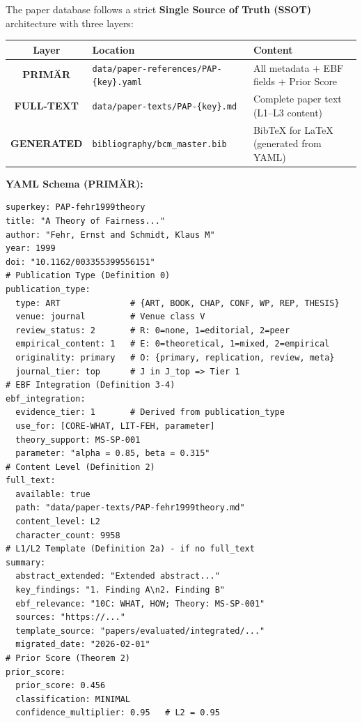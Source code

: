 \begin{tcolorbox}[colback=green!5!white, colframe=green!75!black,
    title=\textbf{SSOT Data Architecture: Paper Database}]

The paper database follows a strict \textbf{Single Source of Truth (SSOT)} architecture
with three layers:

\begin{table}[H]
\centering
\begin{tabular}{@{}clp{5.5cm}@{}}
\toprule
\textbf{Layer} & \textbf{Location} & \textbf{Content} \\
\midrule
\textbf{PRIMÄR} & \texttt{data/paper-references/PAP-\{key\}.yaml} &
    All metadata + EBF fields + Prior Score \\
\textbf{FULL-TEXT} & \texttt{data/paper-texts/PAP-\{key\}.md} &
    Complete paper text (L1--L3 content) \\
\textbf{GENERATED} & \texttt{bibliography/bcm\_master.bib} &
    BibTeX for LaTeX (generated from YAML) \\
\bottomrule
\end{tabular}
\end{table}

\textbf{YAML Schema (PRIMÄR):}
\begin{verbatim}
superkey: PAP-fehr1999theory
title: "A Theory of Fairness..."
author: "Fehr, Ernst and Schmidt, Klaus M"
year: 1999
doi: "10.1162/003355399556151"
# Publication Type (Definition 0)
publication_type:
  type: ART              # {ART, BOOK, CHAP, CONF, WP, REP, THESIS}
  venue: journal         # Venue class V
  review_status: 2       # R: 0=none, 1=editorial, 2=peer
  empirical_content: 1   # E: 0=theoretical, 1=mixed, 2=empirical
  originality: primary   # O: {primary, replication, review, meta}
  journal_tier: top      # J in J_top => Tier 1
# EBF Integration (Definition 3-4)
ebf_integration:
  evidence_tier: 1       # Derived from publication_type
  use_for: [CORE-WHAT, LIT-FEH, parameter]
  theory_support: MS-SP-001
  parameter: "alpha = 0.85, beta = 0.315"
# Content Level (Definition 2)
full_text:
  available: true
  path: "data/paper-texts/PAP-fehr1999theory.md"
  content_level: L2
  character_count: 9958
# L1/L2 Template (Definition 2a) - if no full_text
summary:
  abstract_extended: "Extended abstract..."
  key_findings: "1. Finding A\n2. Finding B"
  ebf_relevance: "10C: WHAT, HOW; Theory: MS-SP-001"
  sources: "https://..."
  template_source: "papers/evaluated/integrated/..."
  migrated_date: "2026-02-01"
# Prior Score (Theorem 2)
prior_score:
  prior_score: 0.456
  classification: MINIMAL
  confidence_multiplier: 0.95   # L2 = 0.95
\end{verbatim}


\end{tcolorbox}
